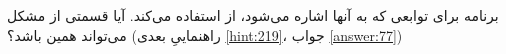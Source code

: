 \section{}
\paragraph{}\label{hint:186}
برنامه برای توابعی که به آنها اشاره می‌شود، از  استفاده می‌کند. آیا قسمتی از مشکل می‌تواند همین باشد؟ (راهنماییِ بعدی \ref{hint:219}، جواب \ref{answer:77})